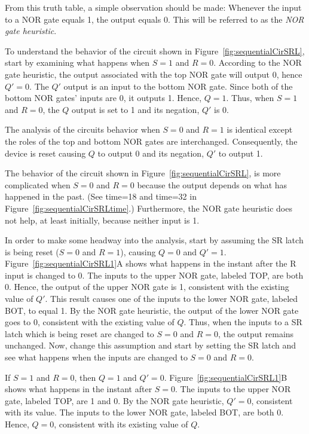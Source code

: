 From this truth table, a simple observation should be made:  
Whenever the input to a NOR gate equals 1, the output equals 0.
This will be referred to as the \textit{ NOR gate heuristic}.

To understand the behavior of the circuit shown in 
Figure~\ref{fig:sequentialCirSRL}, start by examining what happens when 
$S=1$ and $R=0$.  According to the NOR gate heuristic, the output
associated with the top NOR gate will output 0, hence $Q'=0$.  
The $Q'$ output is an input to the bottom NOR gate.  Since both
of the bottom NOR gates' inputs are 0, it outputs 1.  Hence, 
$Q=1$.  Thus, when $S=1$ and $R=0$, the $Q$ output is set to 1 and 
its negation, $Q'$ is 0.

The analysis of the circuits behavior when $S=0$ and $R=1$ is
identical except the roles of the top and bottom NOR gates
are interchanged.  Consequently, the device is reset causing
$Q$ to output 0 and its negation, $Q'$ to output 1.

The behavior of the circuit shown in Figure~\ref{fig:sequentialCirSRL},
is more complicated when $S=0$ and $R=0$ because the output 
depends on what has happened in the past. (See time=18 and time=32
in Figure~\ref{fig:sequentialCirSRLtime}.)  Furthermore, the NOR gate 
heuristic does not help, at least initially, because neither 
input is 1.  

In order to make some headway into the analysis, start
by assuming the SR latch is being reset ($S=0$ and $R=1$),
causing $Q=0$ and $Q'=1$.  Figure~\ref{fig:sequentialCirSRL1}A shows what 
happens in the instant after the R input is changed to 0.
The inputs to the upper NOR gate, labeled TOP, are both 0.
Hence, the output of the upper NOR gate is 1, consistent with 
the existing value of $Q'$.  This result causes one of the inputs to
the lower NOR gate, labeled BOT, to equal 1.  By the NOR
gate heuristic, the output of the lower NOR gate goes to 0,
consistent with the existing value of $Q$.  Thus, when the
inputs to a SR latch which is being reset are changed to 
$S=0$ and $R=0$, the output remains unchanged.  Now, change this
assumption and start by setting the SR latch and see what happens
when the inputs are changed to $S=0$ and $R=0$.

If $S=1$ and $R=0$, then $Q=1$ and $Q'=0$.  Figure~\ref{fig:sequentialCirSRL1}B
shows what happens in the instant after $S=0$.  The inputs to 
the upper NOR gate, labeled TOP, are 1 and 0.  By the NOR
gate heuristic, $Q'=0$, consistent with its value.  The 
inputs to the lower NOR gate, labeled BOT, are both 0. Hence, 
$Q=0$, consistent with its existing value of $Q$.  

